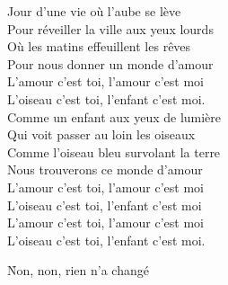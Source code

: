 \documentclass{novel}
\begin{document}
Jour d'une vie où l'aube se lève \\
Pour réveiller la ville aux yeux lourds \\
Où les matins effeuillent les rêves \\
Pour nous donner un monde d'amour \\

L'amour c'est toi, l'amour c'est moi \\
L'oiseau c'est toi, l'enfant c'est moi. \\

Comme un enfant aux yeux de lumière \\
Qui voit passer au loin les oiseaux \\
Comme l'oiseau bleu survolant la terre \\
Nous trouverons ce monde d'amour \\

L'amour c'est toi, l'amour c'est moi \\
L'oiseau c'est toi, l'enfant c'est moi \\

L'amour c'est toi, l'amour c'est moi \\
L'oiseau c'est toi, l'enfant c'est moi.


\newpage
\normalsize

\h*{Non, non, rien n’a changé}
\end{document}
